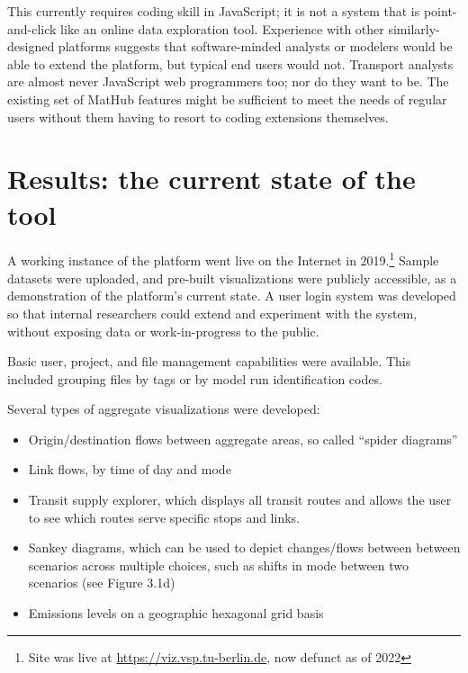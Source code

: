 This currently requires coding skill in JavaScript; it is not a system that is point-and-click like an online data exploration tool. Experience with other similarly-designed platforms suggests that software-minded analysts or modelers would be able to extend the platform, but typical end users would not. Transport analysts are almost never JavaScript web programmers too; nor do they want to be. The existing set of MatHub features might be sufficient to meet the needs of regular users without them having to resort to coding extensions themselves.

\hypertarget{mathub-results-the-current-state-of-the-tool}{%
\section{Results: the current state of the tool}\label{results-the-current-state-of-the-tool}}

A working instance of the platform went live on the Internet in 2019.\footnote{Site was live at \url{https://viz.vsp.tu-berlin.de}, now defunct as of 2022} Sample datasets were uploaded, and pre-built visualizations were publicly accessible, as a demonstration of the platform's current state. A user login system was developed so that internal researchers could extend and experiment with the system, without exposing data or work-in-progress to the public.

Basic user, project, and file management capabilities were available. This included grouping files by tags or by model run identification codes.

Several types of aggregate visualizations were developed:

\begin{itemize}
\tightlist
\item
  Origin/destination flows between aggregate areas, so called ``spider
  diagrams''
\item
  Link flows, by time of day and mode
\item
  Transit supply explorer, which displays all transit routes and allows
  the user to see which routes serve specific stops and links.
\item
  Sankey diagrams, which can be used to depict changes/flows between
  between scenarios across multiple choices, such as shifts in mode
  between two scenarios (see Figure 3.1d)
\item
  Emissions levels on a geographic hexagonal grid basis
\end{itemize}

